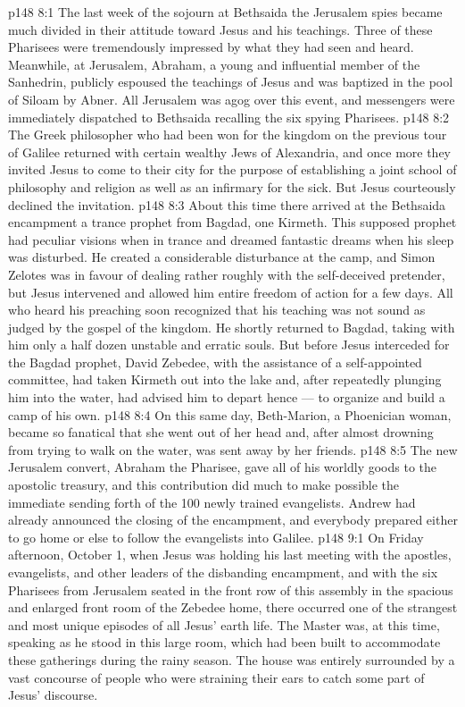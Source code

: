 \vs p148 8:1 The last week of the sojourn at Bethsaida the Jerusalem spies became much divided in their attitude toward Jesus and his teachings. Three of these Pharisees were tremendously impressed by what they had seen and heard. Meanwhile, at Jerusalem, Abraham, a young and influential member of the Sanhedrin, publicly espoused the teachings of Jesus and was baptized in the pool of Siloam by Abner. All Jerusalem was agog over this event, and messengers were immediately dispatched to Bethsaida recalling the six spying Pharisees.
\vs p148 8:2 \pc The Greek philosopher who had been won for the kingdom on the previous tour of Galilee returned with certain wealthy Jews of Alexandria, and once more they invited Jesus to come to their city for the purpose of establishing a joint school of philosophy and religion as well as an infirmary for the sick. But Jesus courteously declined the invitation.
\vs p148 8:3 \pc About this time there arrived at the Bethsaida encampment a trance prophet from Bagdad, one Kirmeth. This supposed prophet had peculiar visions when in trance and dreamed fantastic dreams when his sleep was disturbed. He created a considerable disturbance at the camp, and Simon Zelotes was in favour of dealing rather roughly with the self\hyp{}deceived pretender, but Jesus intervened and allowed him entire freedom of action for a few days. All who heard his preaching soon recognized that his teaching was not sound as judged by the gospel of the kingdom. He shortly returned to Bagdad, taking with him only a half dozen unstable and erratic souls. But before Jesus interceded for the Bagdad prophet, David Zebedee, with the assistance of a self\hyp{}appointed committee, had taken Kirmeth out into the lake and, after repeatedly plunging him into the water, had advised him to depart hence --- to organize and build a camp of his own.
\vs p148 8:4 \pc On this same day, Beth\hyp{}Marion, a Phoenician woman, became so fanatical that she went out of her head and, after almost drowning from trying to walk on the water, was sent away by her friends.
\vs p148 8:5 \pc The new Jerusalem convert, Abraham the Pharisee, gave all of his worldly goods to the apostolic treasury, and this contribution did much to make possible the immediate sending forth of the 100 newly trained evangelists. Andrew had already announced the closing of the encampment, and everybody prepared either to go home or else to follow the evangelists into Galilee.
\vs p148 9:1 On Friday afternoon, October 1, when Jesus was holding his last meeting with the apostles, evangelists, and other leaders of the disbanding encampment, and with the six Pharisees from Jerusalem seated in the front row of this assembly in the spacious and enlarged front room of the Zebedee home, there occurred one of the strangest and most unique episodes of all Jesus’ earth life. The Master was, at this time, speaking as he stood in this large room, which had been built to accommodate these gatherings during the rainy season. The house was entirely surrounded by a vast concourse of people who were straining their ears to catch some part of Jesus’ discourse.
